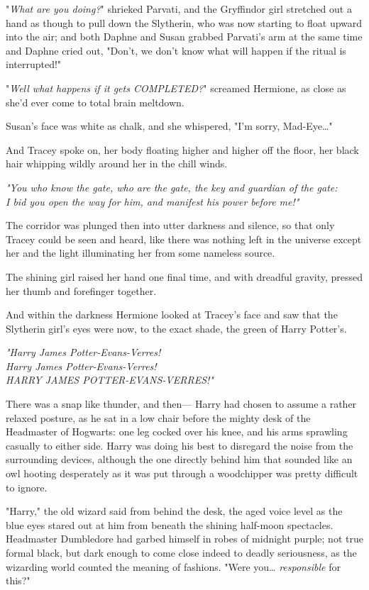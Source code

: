 "\emph{What are you doing?}" shrieked Parvati, and the Gryffindor girl 
stretched out a hand as though to pull down the Slytherin, who was now starting 
to float upward into the air; and both Daphne and Susan grabbed Parvati's arm 
at the same time and Daphne cried out, "Don't, we don't know what will happen 
if the ritual is interrupted!"

"\emph{Well what happens if it gets COMPLETED?}" screamed Hermione, as close as 
she'd ever come to total brain meltdown.

Susan's face was white as chalk, and she whispered, "I'm sorry, Mad-Eye{\ldots}"

And Tracey spoke on, her body floating higher and higher off the floor, her 
black hair whipping wildly around her in the chill winds.

\emph{"You who know the gate, who are the gate, the key and guardian of the 
gate:\\
I bid you open the way for him, and manifest his power before me!"}

The corridor was plunged then into utter darkness and silence, so that only 
Tracey could be seen and heard, like there was nothing left in the universe 
except her and the light illuminating her from some nameless source.

The shining girl raised her hand one final time, and with dreadful gravity, 
pressed her thumb and forefinger together.

And within the darkness Hermione looked at Tracey's face and saw that the 
Slytherin girl's eyes were now, to the exact shade, the green of Harry Potter's.

\emph{"Harry James Potter-Evans-Verres!\\
Harry James Potter-Evans-Verres!\\
HARRY JAMES POTTER-EVANS-VERRES!"}

There was a snap like thunder, and then---
\sbreak
Harry had chosen to assume a rather relaxed posture, as he sat in a low chair 
before the mighty desk of the Headmaster of Hogwarts: one leg cocked over his 
knee, and his arms sprawling casually to either side. Harry was doing his best 
to disregard the noise from the surrounding devices, although the one directly 
behind him that sounded like an owl hooting desperately as it was put through a 
woodchipper was pretty difficult to ignore.

"Harry," the old wizard said from behind the desk, the aged voice level as the 
blue eyes stared out at him from beneath the shining half-moon spectacles. 
Headmaster Dumbledore had garbed himself in robes of midnight purple; not true 
formal black, but dark enough to come close indeed to deadly seriousness, as 
the wizarding world counted the meaning of fashions. "Were you{\ldots} 
\emph{responsible} for this?"

